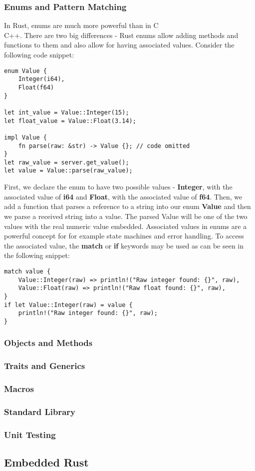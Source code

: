 \subsubsection{Enums and Pattern Matching}
In Rust, enums are much more powerful than in C\\C++.
There are two big differences - Rust enums allow adding methods and functions to them and also allow for having associated values.
Consider the following code snippet:

\begin{lstlisting}
enum Value {
    Integer(i64),
    Float(f64)
}

let int_value = Value::Integer(15);
let float_value = Value::Float(3.14);

impl Value {
    fn parse(raw: &str) -> Value {}; // code omitted
}
let raw_value = server.get_value();
let value = Value::parse(raw_value);
\end{lstlisting}

First, we declare the enum to have two possible values - \textbf{Integer}, with the associated value of \textbf{i64} and \textbf{Float}, with the associated value of \textbf{f64}.
Then, we add a function that parses a reference to a string into our enum \textbf{Value} and then we parse a received string into a value.
The parsed Value will be one of the two values with the real numeric value embedded.
Associated values in enums are a powerful concept for for example state machines and error handling.
To access the associated value, the \textbf{match} or \textbf{if} keywords may be used as can be seen in the following snippet:

\begin{lstlisting}
match value {
    Value::Integer(raw) => println!("Raw integer found: {}", raw),
    Value::Float(raw) => println!("Raw float found: {}", raw),
}
if let Value::Integer(raw) = value {
    println!("Raw integer found: {}", raw);
}
\end{lstlisting}

\subsubsection{Objects and Methods}

\subsubsection{Traits and Generics}

\subsubsection{Macros}

\subsubsection{Standard Library}

\subsubsection{Unit Testing}

\subsection{Embedded Rust}
\label{subsec:embedded_rust}
